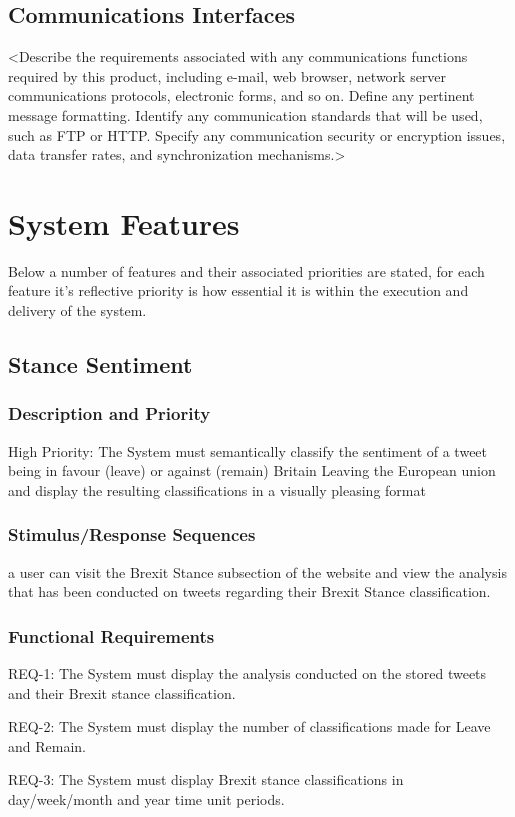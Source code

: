 \documentclass[11pt]{report}
\begin{document}
\subsection*{Communications Interfaces}
<Describe the requirements associated with any communications functions required by this product, including e-mail, web browser, network server communications protocols, electronic forms, and so on. Define any pertinent message formatting. Identify any communication standards that will be used, such as FTP or HTTP. Specify any communication security or encryption issues, data transfer rates, and synchronization mechanisms.>
\section*{System Features}
Below a number of features and their associated priorities are stated, for each feature it’s reflective priority is how essential it is within the execution and delivery of the system.

\subsection*{Stance Sentiment}
\subsubsection*{Description and Priority}
High Priority: The System must semantically classify the sentiment of a tweet being in favour (leave) or against (remain) Britain Leaving the European union and display the resulting classifications in a visually pleasing format
\subsubsection*{Stimulus/Response Sequences}
a user can visit the Brexit Stance subsection of the website and view the analysis that has been conducted on tweets regarding their Brexit Stance classification.
\subsubsection*{Functional Requirements}
REQ-1:	The System must display the analysis conducted on the stored tweets and their Brexit stance classification.

REQ-2: The System must display the number of classifications made for Leave and Remain.

REQ-3: The System must display Brexit stance classifications in day/week/month and year time unit periods.
	
\end{document}
